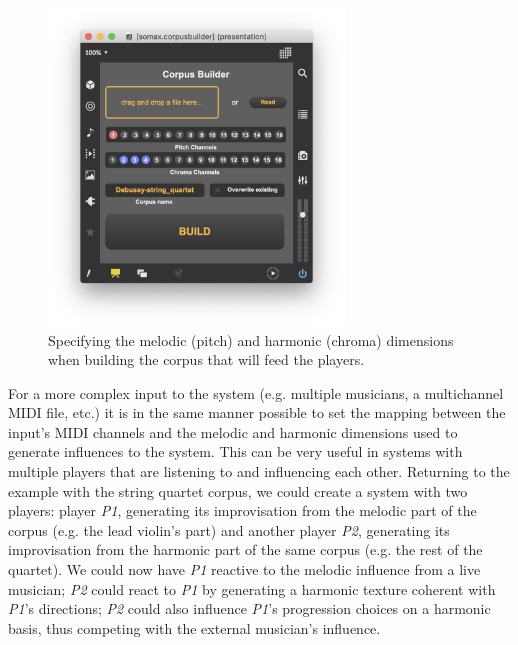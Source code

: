  \begin{figure}[h!]
    \centering        
 	\includegraphics[width=0.7\textwidth, keepaspectratio]{img/corpusbuilder.png}
    \caption{Specifying the melodic (pitch) and harmonic (chroma) dimensions when building the corpus that will feed the players.}
    \label{fig:myFig}
\end{figure}

For a more complex input to the system (e.g. multiple musicians, a multichannel MIDI file, etc.) it is in the same manner possible to  set the mapping between the input's MIDI channels and the melodic and harmonic dimensions used to generate influences to the system. This can be very useful in systems with multiple players that are listening to and influencing each other. Returning to the example with the string quartet corpus, we could create a system with two players: player \textit{P1}, generating its improvisation from the melodic part of the corpus (e.g. the lead violin's part) and another player \textit{P2}, generating its improvisation from the harmonic part of the same corpus (e.g. the rest of the quartet). We could now have \textit{P1} reactive to the melodic influence from a live musician; \textit{P2} could react to \textit{P1} by generating a harmonic texture coherent with \textit{P1}'s directions; \textit{P2} could also influence \textit{P1}'s progression choices on a harmonic basis, thus competing with the external musician's influence. 

